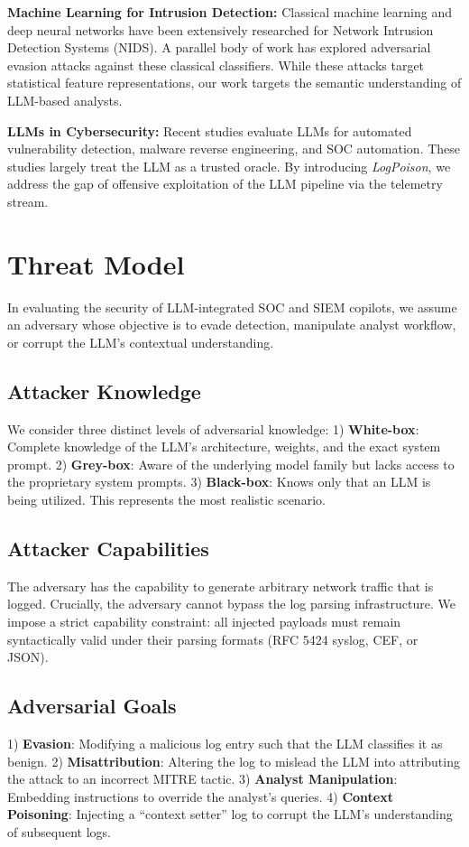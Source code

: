 \documentclass[conference]{IEEEtran}
\begin{document}
\textbf{Machine Learning for Intrusion Detection:} Classical machine learning and deep neural networks have been extensively researched for Network Intrusion Detection Systems (NIDS). A parallel body of work has explored adversarial evasion attacks against these classical classifiers. While these attacks target statistical feature representations, our work targets the semantic understanding of LLM-based analysts. 

\textbf{LLMs in Cybersecurity:} Recent studies evaluate LLMs for automated vulnerability detection, malware reverse engineering, and SOC automation. These studies largely treat the LLM as a trusted oracle. By introducing \textit{LogPoison}, we address the gap of offensive exploitation of the LLM pipeline via the telemetry stream.

\section{Threat Model}
In evaluating the security of LLM-integrated SOC and SIEM copilots, we assume an adversary whose objective is to evade detection, manipulate analyst workflow, or corrupt the LLM's contextual understanding. 

\subsection{Attacker Knowledge}
We consider three distinct levels of adversarial knowledge:
1) \textbf{White-box}: Complete knowledge of the LLM's architecture, weights, and the exact system prompt.
2) \textbf{Grey-box}: Aware of the underlying model family but lacks access to the proprietary system prompts.
3) \textbf{Black-box}: Knows only that an LLM is being utilized. This represents the most realistic scenario.

\subsection{Attacker Capabilities}
The adversary has the capability to generate arbitrary network traffic that is logged. Crucially, the adversary cannot bypass the log parsing infrastructure. We impose a strict capability constraint: all injected payloads must remain syntactically valid under their parsing formats (RFC 5424 syslog, CEF, or JSON). 

\subsection{Adversarial Goals}
1) \textbf{Evasion}: Modifying a malicious log entry such that the LLM classifies it as benign.
2) \textbf{Misattribution}: Altering the log to mislead the LLM into attributing the attack to an incorrect MITRE tactic.
3) \textbf{Analyst Manipulation}: Embedding instructions to override the analyst's queries.
4) \textbf{Context Poisoning}: Injecting a ``context setter'' log to corrupt the LLM's understanding of subsequent logs.
\end{document}
